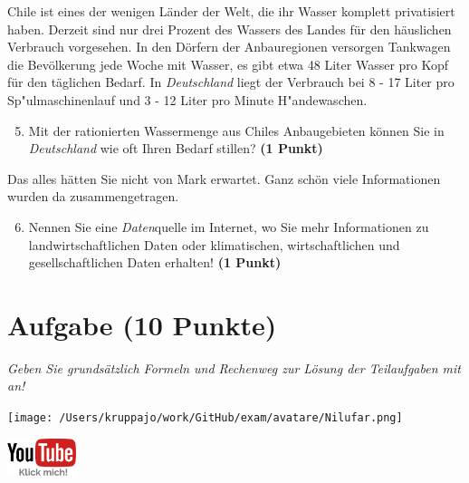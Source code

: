 \documentclass[a4paper, 9pt]{scrartcl}\usepackage[]{graphicx}\usepackage[]{xcolor}
\begin{document}
Chile ist eines der wenigen Länder der Welt, die ihr Wasser komplett privatisiert haben. Derzeit sind nur drei Prozent des Wassers des Landes für den häuslichen Verbrauch vorgesehen. In den Dörfern der Anbauregionen versorgen Tankwagen die Bevölkerung jede Woche mit Wasser, es gibt etwa 48 Liter Wasser pro Kopf für den täglichen Bedarf. In \textit{Deutschland} liegt der Verbrauch bei 8 - 17 Liter pro Sp{"u}lmaschinenlauf und 3 - 12 Liter pro Minute H{"a}ndewaschen.

\begin{enumerate}
  \setcounter{enumi}{4}
\item Mit der rationierten Wassermenge aus Chiles Anbaugebieten können Sie in \textit{Deutschland} wie oft Ihren Bedarf stillen? \textbf{(1 Punkt)}
\end{enumerate}

Das alles hätten Sie nicht von Mark erwartet. Ganz schön viele Informationen wurden da zusammengetragen.

\begin{enumerate}
  \setcounter{enumi}{5}  
  \item Nennen Sie eine \textit{Daten}quelle im Internet, wo Sie mehr Informationen zu landwirtschaftlichen Daten oder klimatischen, wirtschaftlichen und gesellschaftlichen Daten erhalten! \textbf{(1 Punkt)}
\end{enumerate} 
\clearpage

\section{Aufgabe \hfill (10 Punkte)}

\textit{Geben Sie grundsätzlich Formeln und Rechenweg zur Lösung der Teilaufgaben mit an!} \\[1Ex]
 

 
\ifcollection
\begin{flushright}
\tiny\vspace{-3Ex}
\textbf{\examinhaltstart}
\exammodulemathstat
\vspace{-4Ex}
\end{flushright}
\begin{minipage}[t]{0.5\textwidth}
\texttt{[image: /Users/kruppajo/work/GitHub/exam/avatare/Nilufar.png]}
\end{minipage}
\begin{minipage}[t]{0.5\textwidth}
\hfill
\href{https://youtu.be/WZSxntiNF8s}{\includegraphics[width = 2cm]{img/youtube}}
\end{minipage}
\fi
\end{document}
